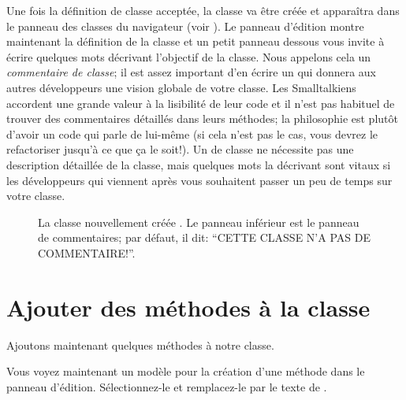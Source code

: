 \documentclass[a4paper,10pt,twoside]{book}
\begin{document}
Une fois la définition de classe acceptée, la classe va \^etre créée et
apparaîtra dans le panneau des classes du navigateur (voir ).
Le panneau d'édition montre maintenant la définition de la classe et
un petit panneau dessous vous invite à écrire quelques mots décrivant
l'objectif de la classe. Nous appelons cela un \emph{commentaire de
  classe}; il est assez important d'en écrire un qui donnera aux
autres développeurs une vision 
globale de votre classe.
Les Smalltalkiens accordent une grande valeur à la lisibilité de leur
code et il n'est pas habituel de trouver des commentaires détaillés
dans leurs méthodes; la philosophie est plutôt d'avoir un code qui
parle de lui-m\^eme (si cela n'est pas le cas, vous devrez le
refactoriser jusqu'à ce que \c{c}a le soit!). 
Un  de classe ne nécessite pas une
description détaillée de la classe, mais quelques mots la décrivant
sont vitaux si les développeurs qui viennent après vous souhaitent
passer un peu de temps sur votre classe.


\begin{figure}[h!t]
\caption{La classe nouvellement créée . Le panneau
  inférieur est le panneau de commentaires; par défaut, il dit:
  ``CETTE CLASSE N'A PAS DE COMMENTAIRE!''.
}
\end{figure}

\section{Ajouter des méthodes à la classe}

Ajoutons maintenant quelques méthodes à notre classe.

Vous voyez maintenant un modèle pour la création d'une méthode dans le panneau d'édition.
Sélectionnez-le et remplacez-le par le texte de .
\end{document}

